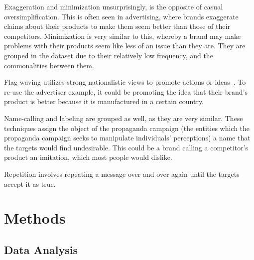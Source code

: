 \documentclass[twocolumn]{article}
\begin{document}
Exaggeration and minimization unsurprisingly, is the opposite of casual oversimplification. This is often seen in advertising, where brands exaggerate claims about their products to make them seem better than those of their competitors. Minimization is very similar to this, whereby a brand may make problems with their products seem like less of an issue than they are. They are grouped in the dataset due to their relatively low frequency, and the commonalities between them. 

Flag waving utilizes strong nationalistic views to promote actions or ideas~\cite{hobbs2014teaching}. To re-use the advertiser example, it could be promoting the idea that their brand's product is better because it is manufactured in a certain country.

Name-calling and labeling are grouped as well, as they are very similar. These techniques assign the object of the propaganda campaign (the entities which the propaganda campaign seeks to manipulate individuals' perceptions) a name that the targets would find undesirable. This could be a brand calling a competitor's product an imitation, which most people would dislike. 

Repetition involves repeating a message over and over again until the targets accept it as true. 

\section{Methods}


\subsection{Data Analysis}
\end{document}
